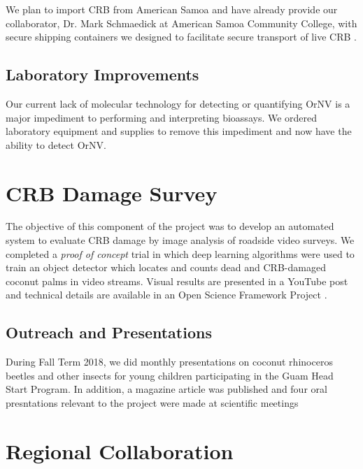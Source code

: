 \documentclass[12pt,letterpaper,english,bibliography=totocnumbered]{scrartcl}
\begin{document}
We plan to import CRB from American Samoa and have already provide our collaborator, Dr. Mark Schmaedick at American Samoa Community College, with secure shipping containers we designed to facilitate secure transport of live CRB \cite{moore_container_2017-1}.

\subsection{Laboratory Improvements}

Our current lack of molecular technology for detecting or quantifying OrNV is a major impediment to performing and interpreting bioassays. We ordered laboratory equipment and supplies to remove this impediment and now have the ability to detect OrNV. 


\section{CRB Damage Survey}

The objective of this component of the project was to develop an automated system to evaluate CRB damage by image analysis of roadside video surveys.  We completed a \textit{proof of concept} trial in which deep learning algorithms were used to train an object detector which locates and counts dead and CRB-damaged coconut palms in video streams.  Visual results are presented in a YouTube post \cite{moore_training_2019} and technical details are available in an Open Science Framework Project \cite{moore_open_2019}.

\begin{refsection}
\section{Outreach and Presentations}
	
During Fall Term 2018, we did monthly presentations on coconut rhinoceros beetles and other insects for young children participating in the Guam Head Start Program. In addition, a magazine article was published \cite{moore_special_2018} and four oral presntations relevant to the project were made at scientific meetings \cite{moore_coconut_2019-2, moore_impact_2017-1, moore_failed_2018-1}

\printbibliography[heading=none]
	
\end{refsection}

\newpage
\section{Regional Collaboration}
\end{document}
